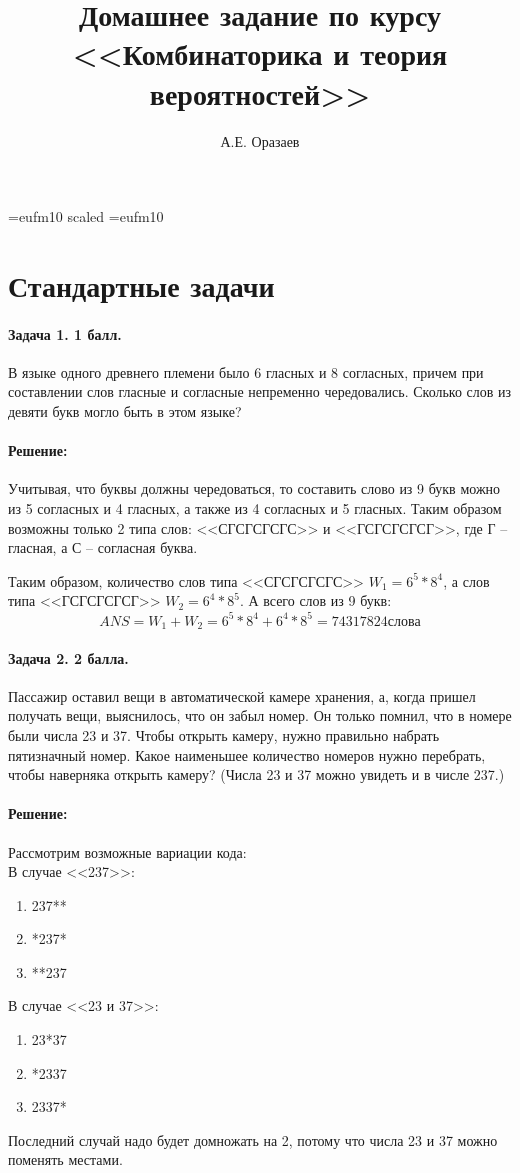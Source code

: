 \documentclass[12pt]{article}
\title{\bf Домашнее задание по курсу \\ <<Комбинаторика 
и теория вероятностей>>}
\author{А.Е. Оразаев}
\date{}
\begin{document}
\voffset=-20mm 
\hoffset=-12mm
\font\Got=eufm10 scaled \font\Got=eufm10

\maketitle

\section{Стандартные задачи}



\paragraph{Задача 1. 1 балл.} В языке одного древнего племени было 
6 гласных и 8 согласных, причем при составлении слов гласные и 
согласные непременно чередовались. Сколько слов из девяти букв 
могло быть в этом языке? 

\paragraph{\bf Решение:}
Учитывая, что буквы должны чередоваться, то составить слово из 9 букв
можно из 5 согласных и 4 гласных, а также из 4 согласных и 5 гласных.
Таким образом возможны только 2 типа слов: <<СГСГСГСГС>> и <<ГСГСГСГСГ>>, где
Г -- гласная, а С -- согласная буква.

Таким образом, количество слов типа <<СГСГСГСГС>> $ W_1 = 6^5 * 8^4 $,
а слов типа <<ГСГСГСГСГ>> $ W_2 = 6^4 * 8^5 $. А всего слов из 9 букв:
$$ ANS = W_1 + W_2 = 6^5 * 8^4 + 6^4 * 8^5 = 74317824 слова$$



\paragraph{Задача 2. 2 балла.} Пассажир оставил вещи в 
автоматической камере хранения, а, когда пришел получать вещи, 
выяснилось, что он забыл номер. Он только помнил, что в номере 
были числа 23 и 37. Чтобы открыть камеру, нужно правильно 
набрать пятизначный номер. Какое наименьшее количество номеров 
нужно перебрать, чтобы наверняка открыть камеру? (Числа 23 и 37 
можно увидеть и в числе 237.)

\paragraph{\bf Решение:}
Рассмотрим возможные вариации кода: \\
В случае <<237>>:
\begin{enumerate}
\item 237**
\item *237*
\item **237
\end{enumerate}
В случае <<23 и 37>>:
\begin{enumerate}
\item 23*37
\item *2337
\item 2337*
\end{enumerate}
Последний случай надо будет домножать на 2, потому что числа 23 и 37
можно поменять местами.
\end{document}
